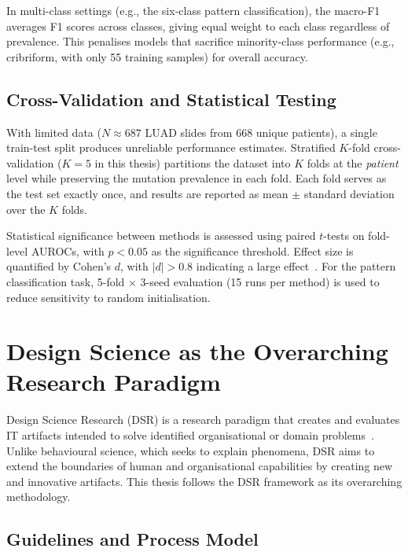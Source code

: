In multi-class settings (e.g., the six-class pattern classification), the macro-F1 averages F1 scores across classes, giving equal weight to each class regardless of prevalence.
This penalises models that sacrifice minority-class performance (e.g., cribriform, with only 55 training samples) for overall accuracy.

\subsection{Cross-Validation and Statistical Testing}
\label{sec:bg:cv}

With limited data ($N \approx 687$ LUAD slides from 668 unique patients),
a single train-test split produces unreliable performance estimates.
Stratified $K$-fold cross-validation ($K = 5$ in this thesis) partitions
the dataset into $K$ folds at the \emph{patient} level while preserving
the mutation prevalence in each fold.
Each fold serves as the test set exactly once, and results are reported
as mean $\pm$ standard deviation over the $K$ folds.

Statistical significance between methods is assessed using paired
$t$-tests on fold-level AUROCs, with $p < 0.05$ as the significance
threshold.
Effect size is quantified by Cohen's $d$, with $|d| > 0.8$ indicating
a large effect~\cite{cohen1988statistical}.
For the pattern classification task, 5-fold $\times$ 3-seed evaluation
(15 runs per method) is used to reduce sensitivity to random initialisation.


\section{Design Science as the Overarching Research Paradigm}
\label{sec:bg:dsr}

Design Science Research (DSR) is a research paradigm that creates and evaluates IT artifacts intended to solve identified organisational or domain problems~\cite{hevner2004design,peffers2007dsrm}.
Unlike behavioural science, which seeks to explain phenomena, DSR aims to extend the boundaries of human and organisational capabilities by creating new and innovative artifacts.
This thesis follows the DSR framework as its overarching methodology.

\subsection{Guidelines and Process Model}
\label{sec:bg:dsr:framework}

